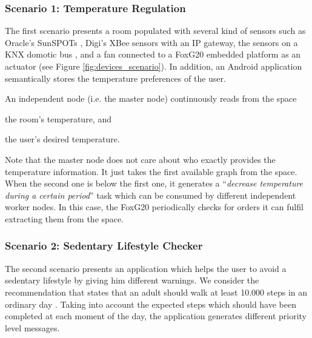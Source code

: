 \subsubsection{Scenario 1: Temperature Regulation}
\label{sec:envisaged_scn1}

The first scenario presents a room populated with several kind of sensors such as Oracle's SunSPOTs ,
Digi's XBee sensors with an IP gateway,
the sensors on a KNX domotic bus , and a fan connected to a FoxG20  embedded platform as an actuator (see Figure \ref{fig:devices_scenario}).
In addition, an Android application  semantically stores the temperature preferences of the user.




An independent node (i.e. the master node) continuously reads from the space %
\begin{enumerate*}[label=\itshape(\arabic*\upshape)]
  \item the room's temperature, and
  \item the user's desired temperature.
\end{enumerate*}
Note that the master node does not care about who exactly provides the temperature information.
It just takes the first available graph from the space.
When the second one is below the first one, it generates a ``\emph{decrease temperature during a certain period}'' task which can be consumed by different independent worker nodes.
In this case, the FoxG20 periodically checks for orders it can fulfil extracting them from the space. %



\subsubsection{Scenario 2: Sedentary Lifestyle Checker}
\label{sec:envisaged_scn2}

The second scenario presents an application which helps the user to avoid a sedentary lifestyle by giving him different warnings.
We consider the recommendation that states that an adult should walk at least 10.000 steps in an ordinary day \citep{tudor2002taking}.
Taking into account the expected steps which should have been completed at each moment of the day, the application generates different priority level messages.

